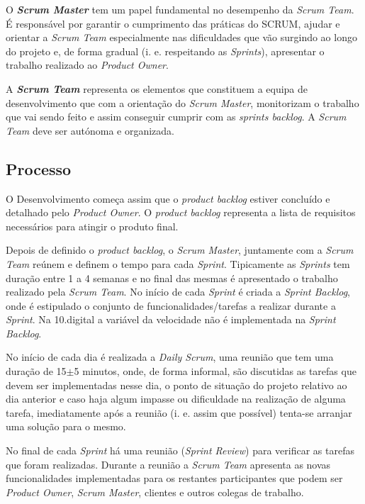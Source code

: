 O \textbf{\textit{Scrum Master}} tem um papel fundamental no desempenho da \textit{Scrum Team}. É responsável por garantir o cumprimento das práticas do SCRUM, ajudar e orientar a \textit{Scrum Team} especialmente nas dificuldades que vão surgindo ao longo do projeto e, de forma gradual (i. e. respeitando as \textit{Sprints}), apresentar o trabalho realizado ao \textit{Product Owner}.

A \textbf{\textit{Scrum Team}} representa os elementos que constituem a equipa de desenvolvimento que com a orientação do \textit{Scrum Master}, monitorizam o trabalho que vai sendo feito e assim conseguir cumprir com as \textit{sprints backlog}. A \textit{Scrum Team} deve ser autónoma e organizada. 

\subsection{Processo}

O Desenvolvimento começa assim que o \textit{product backlog} estiver concluído e detalhado pelo \textit{Product Owner}. O \textit{product backlog} representa a lista de requisitos necessários para atingir o produto final. 

Depois de definido o \textit{product backlog}, o \textit{Scrum Master}, juntamente com a \textit{Scrum Team} reúnem e definem o tempo para cada \textit{Sprint}. Tipicamente as \textit{Sprints} tem duração entre 1 a 4 semanas e no final das mesmas é apresentado o trabalho realizado pela \textit{Scrum Team}. No início de cada \textit{Sprint} é criada a \textit{Sprint Backlog}, onde é estipulado o conjunto de funcionalidades/tarefas a realizar durante a \textit{Sprint}. Na 10.digital a variável da velocidade não é implementada na \textit{Sprint Backlog}.

No início de cada dia é realizada a \textit{Daily Scrum}, uma reunião que tem uma duração de 15$\pm$5 minutos, onde, de forma informal, são discutidas as tarefas que devem ser implementadas nesse dia, o ponto de situação do projeto relativo ao dia anterior e caso haja algum impasse ou dificuldade na realização de alguma tarefa, imediatamente após a reunião (i. e. assim que possível) tenta-se arranjar uma solução para o mesmo. 

No final de cada \textit{Sprint} há uma reunião (\textit{Sprint Review}) para verificar as tarefas que foram realizadas. Durante a reunião a \textit{Scrum Team} apresenta as novas funcionalidades implementadas para os restantes participantes que podem ser \textit{Product Owner}, \textit{Scrum Master}, clientes e outros colegas de trabalho. 


